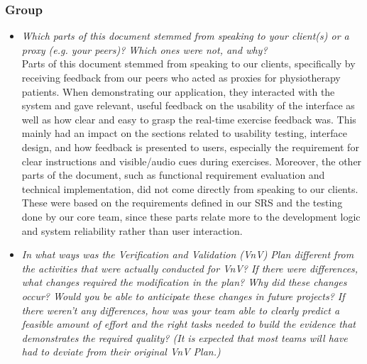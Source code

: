 \documentclass[12pt, titlepage]{article}
\begin{document}
\subsubsection*{Group}
\begin{itemize}
  \item \textit{Which parts of this document stemmed from speaking to
      your client(s) or
    a proxy (e.g. your peers)? Which ones were not, and why?} \\

    Parts of this document stemmed from speaking to our clients, specifically by receiving feedback 
    from our peers who acted as proxies for physiotherapy patients. When demonstrating our application, 
    they interacted with the system and gave relevant, useful feedback on the usability of the interface 
    as well as how clear and easy to grasp the real-time exercise feedback was. This mainly had an impact 
    on the sections related to usability testing, interface design, and how feedback is presented to users, 
    especially the requirement for clear instructions and visible/audio cues during exercises. Moreover, the 
    other parts of the document, such as functional requirement evaluation and technical implementation, did 
    not come directly from speaking to our clients. These were based on the requirements defined in our SRS and 
    the testing done by our core team, since these parts relate more to the development logic and system reliability 
    rather than user interaction.


  \item \textit{In what ways was the Verification and Validation
        (VnV) Plan different
        from the activities that were actually conducted for VnV?  If there were
        differences, what changes required the modification in the plan?  Why did
        these changes occur?  Would you be able to anticipate these
        changes in future
        projects?  If there weren't any differences, how was your team
        able to clearly
        predict a feasible amount of effort and the right tasks needed
        to build the
        evidence that demonstrates the required quality?  (It is
          expected that most
      teams will have had to deviate from their original VnV Plan.)}\\
      

\end{itemize}
\end{document}
